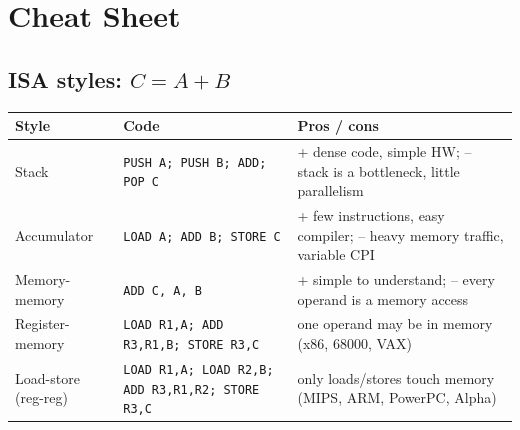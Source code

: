 \documentclass[11pt]{article}
\begin{document}
\sloppy
{}

\section{Cheat Sheet}

\subsection{ISA styles: $C = A + B$}
\begin{center}
\small
\begin{tabular}{@{}lp{4.6cm}p{5.2cm}@{}}
\toprule
Style & Code & Pros / cons \\
\midrule
Stack & \texttt{PUSH A; PUSH B; ADD; POP C} & + dense code, simple HW; -- stack is a bottleneck, little parallelism \\
Accumulator & \texttt{LOAD A; ADD B; STORE C} & + few instructions, easy compiler; -- heavy memory traffic, variable CPI \\
Memory-memory & \texttt{ADD C, A, B} & + simple to understand; -- every operand is a memory access \\
Register-memory & \texttt{LOAD R1,A; ADD R3,R1,B; STORE R3,C} & one operand may be in memory (x86, 68000, VAX) \\
Load-store (reg-reg) & \texttt{LOAD R1,A; LOAD R2,B; ADD R3,R1,R2; STORE R3,C} & only loads/stores touch memory (MIPS, ARM, PowerPC, Alpha) \\
\bottomrule
\end{tabular}
\end{center}
\end{document}
